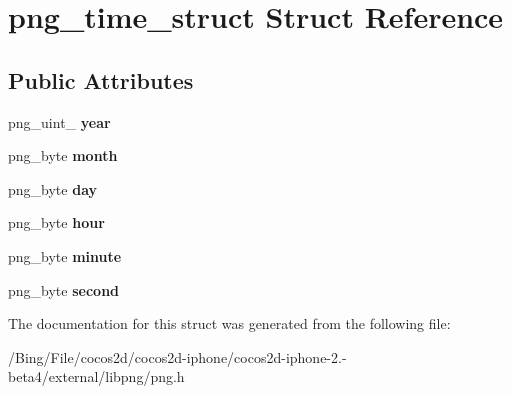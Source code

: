 \hypertarget{structpng__time__struct}{\section{png\-\_\-time\-\_\-struct Struct Reference}
\label{structpng__time__struct}
}
\subsection*{Public Attributes}
\begin{DoxyCompactItemize}
\item 
\hypertarget{structpng__time__struct_a5cceb6213fc7b4462435ea1d8fc1c798}{png\-\_\-uint\-\_ {\bfseries year}}\label{structpng__time__struct_a5cceb6213fc7b4462435ea1d8fc1c798}

\item 
\hypertarget{structpng__time__struct_a3ab550977ee2cb1165c0398131f2e601}{png\-\_\-byte {\bfseries month}}\label{structpng__time__struct_a3ab550977ee2cb1165c0398131f2e601}

\item 
\hypertarget{structpng__time__struct_afa0f94516a676178d1dabeb96eccdcdb}{png\-\_\-byte {\bfseries day}}\label{structpng__time__struct_afa0f94516a676178d1dabeb96eccdcdb}

\item 
\hypertarget{structpng__time__struct_a79ac8b217254fd87cdc7299e6612a6f4}{png\-\_\-byte {\bfseries hour}}\label{structpng__time__struct_a79ac8b217254fd87cdc7299e6612a6f4}

\item 
\hypertarget{structpng__time__struct_ad3ce11e9d92b77a33b3f7480bf0fff8c}{png\-\_\-byte {\bfseries minute}}\label{structpng__time__struct_ad3ce11e9d92b77a33b3f7480bf0fff8c}

\item 
\hypertarget{structpng__time__struct_a84e528e4c4c7d76cd2252e0d0d2ed0c9}{png\-\_\-byte {\bfseries second}}\label{structpng__time__struct_a84e528e4c4c7d76cd2252e0d0d2ed0c9}

\end{DoxyCompactItemize}


The documentation for this struct was generated from the following file\-:\begin{DoxyCompactItemize}
\item 
/\-Bing/\-File/cocos2d/cocos2d-\/iphone/cocos2d-\/iphone-\/2.-\/beta4/external/libpng/png.\-h\end{DoxyCompactItemize}
